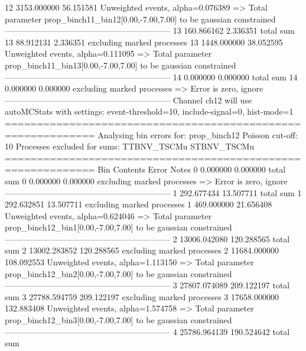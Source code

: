 12         3153.000000     56.151581       Unweighted events, alpha=0.076389
  => Total parameter prop_binch11_bin12[0.00,-7.00,7.00] to be gaussian constrained
------------------------------------------------------------
13         160.866162      2.336351        total sum                     
13         88.912131       2.336351        excluding marked processes    
13         1448.000000     38.052595       Unweighted events, alpha=0.111095
  => Total parameter prop_binch11_bin13[0.00,-7.00,7.00] to be gaussian constrained
------------------------------------------------------------
14         0.000000        0.000000        total sum                     
14         0.000000        0.000000        excluding marked processes    
  => Error is zero, ignore      
------------------------------------------------------------
Channel ch12 will use autoMCStats with settings: event-threshold=10, include-signal=0, hist-mode=1
============================================================
Analysing bin errors for: prop_binch12
Poisson cut-off: 10
Processes excluded for sums: TTBNV_TSCMu STBNV_TSCMu
============================================================
Bin        Contents        Error           Notes                         
0          0.000000        0.000000        total sum                     
0          0.000000        0.000000        excluding marked processes    
  => Error is zero, ignore      
------------------------------------------------------------
1          292.677434      13.507711       total sum                     
1          292.632851      13.507711       excluding marked processes    
1          469.000000      21.656408       Unweighted events, alpha=0.624046
  => Total parameter prop_binch12_bin1[0.00,-7.00,7.00] to be gaussian constrained
------------------------------------------------------------
2          13006.042080    120.288565      total sum                     
2          13002.283852    120.288565      excluding marked processes    
2          11684.000000    108.092553      Unweighted events, alpha=1.113150
  => Total parameter prop_binch12_bin2[0.00,-7.00,7.00] to be gaussian constrained
------------------------------------------------------------
3          27807.074089    209.122197      total sum                     
3          27788.594759    209.122197      excluding marked processes    
3          17658.000000    132.883408      Unweighted events, alpha=1.574758
  => Total parameter prop_binch12_bin3[0.00,-7.00,7.00] to be gaussian constrained
------------------------------------------------------------
4          25786.964139    190.524642      total sum                     
